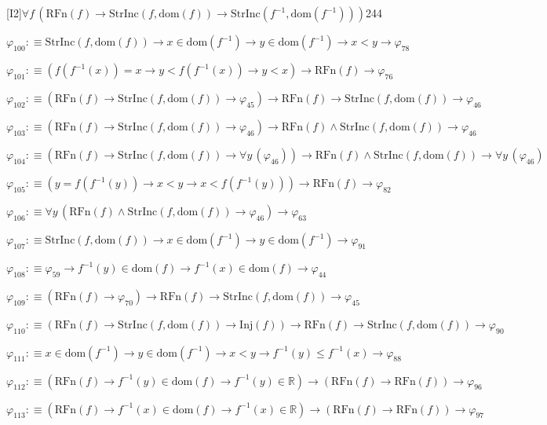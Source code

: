 \begin{fullproof}{[I2]}{$\forall f\,(\mathrm{RFn}(f) \to \mathrm{StrInc}(f,\mathrm{dom}(f)) \to \mathrm{StrInc}(f^{-1},\mathrm{dom}(f^{-1})))$}{244}
\begin{abbrevlist}
\item $\varphi_{100} :\equiv \mathrm{StrInc}(f,\mathrm{dom}(f)) \to x \in \mathrm{dom}(f^{-1}) \to y \in \mathrm{dom}(f^{-1}) \to x < y \to \varphi_{78}$
\item $\varphi_{101} :\equiv (f(f^{-1}(x)) = x \to y < f(f^{-1}(x)) \to y < x) \to \mathrm{RFn}(f) \to \varphi_{76}$
\item $\varphi_{102} :\equiv (\mathrm{RFn}(f) \to \mathrm{StrInc}(f,\mathrm{dom}(f)) \to \varphi_{45}) \to \mathrm{RFn}(f) \to \mathrm{StrInc}(f,\mathrm{dom}(f)) \to \varphi_{46}$
\item $\varphi_{103} :\equiv (\mathrm{RFn}(f) \to \mathrm{StrInc}(f,\mathrm{dom}(f)) \to \varphi_{46}) \to \mathrm{RFn}(f) \land \mathrm{StrInc}(f,\mathrm{dom}(f)) \to \varphi_{46}$
\item $\varphi_{104} :\equiv (\mathrm{RFn}(f) \to \mathrm{StrInc}(f,\mathrm{dom}(f)) \to \forall y\,(\varphi_{46})) \to \mathrm{RFn}(f) \land \mathrm{StrInc}(f,\mathrm{dom}(f)) \to \forall y\,(\varphi_{46})$
\item $\varphi_{105} :\equiv (y = f(f^{-1}(y)) \to x < y \to x < f(f^{-1}(y))) \to \mathrm{RFn}(f) \to \varphi_{82}$
\item $\varphi_{106} :\equiv \forall y\,(\mathrm{RFn}(f) \land \mathrm{StrInc}(f,\mathrm{dom}(f)) \to \varphi_{46}) \to \varphi_{63}$
\item $\varphi_{107} :\equiv \mathrm{StrInc}(f,\mathrm{dom}(f)) \to x \in \mathrm{dom}(f^{-1}) \to y \in \mathrm{dom}(f^{-1}) \to \varphi_{91}$
\item $\varphi_{108} :\equiv \varphi_{59} \to f^{-1}(y) \in \mathrm{dom}(f) \to f^{-1}(x) \in \mathrm{dom}(f) \to \varphi_{44}$
\item $\varphi_{109} :\equiv (\mathrm{RFn}(f) \to \varphi_{70}) \to \mathrm{RFn}(f) \to \mathrm{StrInc}(f,\mathrm{dom}(f)) \to \varphi_{45}$
\item $\varphi_{110} :\equiv (\mathrm{RFn}(f) \to \mathrm{StrInc}(f,\mathrm{dom}(f)) \to \mathrm{Inj}(f)) \to \mathrm{RFn}(f) \to \mathrm{StrInc}(f,\mathrm{dom}(f)) \to \varphi_{90}$
\item $\varphi_{111} :\equiv x \in \mathrm{dom}(f^{-1}) \to y \in \mathrm{dom}(f^{-1}) \to x < y \to f^{-1}(y) \leq f^{-1}(x) \to \varphi_{88}$
\item $\varphi_{112} :\equiv (\mathrm{RFn}(f) \to f^{-1}(y) \in \mathrm{dom}(f) \to f^{-1}(y) \in \mathbb{R}) \to (\mathrm{RFn}(f) \to \mathrm{RFn}(f)) \to \varphi_{96}$
\item $\varphi_{113} :\equiv (\mathrm{RFn}(f) \to f^{-1}(x) \in \mathrm{dom}(f) \to f^{-1}(x) \in \mathbb{R}) \to (\mathrm{RFn}(f) \to \mathrm{RFn}(f)) \to \varphi_{97}$

\end{abbrevlist}
\end{fullproof}
